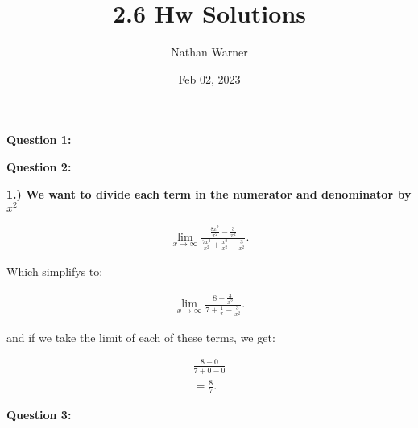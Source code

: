 \documentclass{report}
\title{\Huge{2.6 Hw Solutions}}
\author{\huge{Nathan Warner}}
\date{\huge{Feb 02, 2023}}
\begin{document}
    \maketitle
    \begin{Large}
        \noindent \textbf{Question 1:}
    \end{Large}

    \bigbreak \noindent \bigbreak \noindent 
    \bigbreak \noindent 

    \bigbreak \noindent \bigbreak \noindent  
    \begin{Large}
        \noindent \textbf{Question 2:}
    \end{Large}

    \bigbreak \noindent \bigbreak \noindent 
    \bigbreak \noindent 
    \textbf{1.) We want to divide each term in the numerator and denominator by $x^2$}

    \bigbreak \noindent 
    \begin{align*}
        \lim\limits_{x \to \infty}{ \frac{ \frac{8x^2}{x^2} - \frac{3}{x^2}}{ \frac{7x^2}{x^2} + \frac{x^2}{x^2} - \frac{3}{x^2}}}
    .\end{align*}

    \bigbreak \noindent 
    Which simplifys to:

    \begin{align*}
        \lim\limits_{x \to \infty}{ \frac{8 - \frac{3}{x^2}}{7 + \frac{1}{x} - \frac{3}{x^2}}}
    .\end{align*}

    \bigbreak \noindent 
    and if we take the limit of each of these terms, we get:

    \begin{align*}
        \frac{8-0}{7+0-0} \\
        = \frac{8}{7}
    .\end{align*}

    \bigbreak \noindent \bigbreak \noindent 

    \bigbreak \noindent \bigbreak \noindent  
    \begin{Large}
        \noindent \textbf{Question 3:}
    \end{Large}
\end{document}
